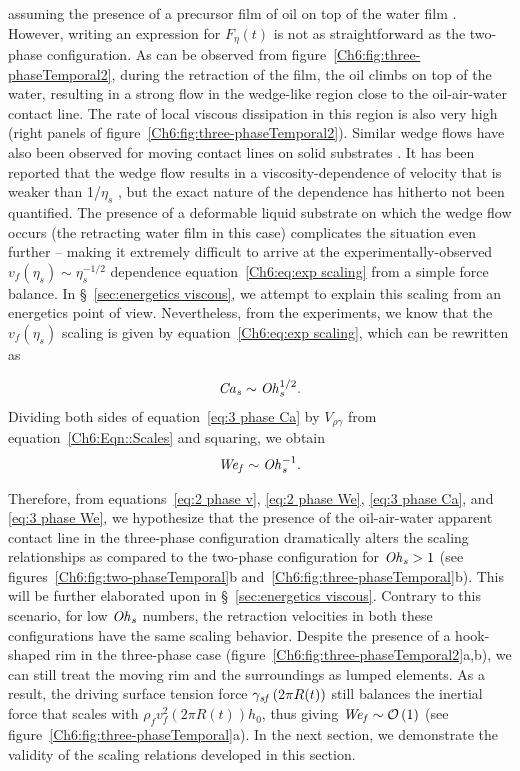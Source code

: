 \noindent assuming the presence of a precursor film of oil on top of the water film \citep[see \S~\ref{Ch6:sec:3-phaseTC Num methods} and][]{book-degennes, bonn2009wetting, thoraval-2013-pre}. However, writing an expression for $F_{\eta}(t)$ is not as straightforward as the two-phase configuration. As can be observed from figure~\ref{Ch6:fig:three-phaseTemporal2}, during the retraction of the film, the oil climbs on top of the water, resulting in a strong flow in the wedge-like region close to the oil-air-water contact line. The rate of local viscous dissipation in this region is also very high (right panels of figure~\ref{Ch6:fig:three-phaseTemporal2}). Similar wedge flows have also been observed for moving contact lines on solid substrates \citep{degennes-1985-rmp, marchand-2012-prl, snoeijer-2013-arfm}. It has been reported that the wedge flow results in a viscosity-dependence of velocity that is weaker than 1/$\eta_{s}$ \citep{marchand-2012-prl}, but the exact nature of the dependence has hitherto not been quantified. The presence of a deformable liquid substrate on which the wedge flow occurs (the retracting water film in this case) complicates the situation even further -- making it extremely difficult to arrive at the experimentally-observed $v_f(\eta_{s}) \sim \eta_{s}^{-1/2}$ dependence equation~\eqref{Ch6:eq:exp scaling} from a simple force balance. In \S~\ref{sec:energetics viscous}, we attempt to explain this scaling from an energetics point of view. Nevertheless, from the experiments, we know that the $v_f (\eta_{s})$ scaling is given by equation~\eqref{Ch6:eq:exp scaling}, which can be rewritten as

\begin{align}
	\mathit{Ca}_\mathit{s} \sim \mathit{Oh}_\mathit{s}^{1/2} .
	\label{eq:3 phase Ca}
\end{align}
Dividing both sides of equation~\eqref{eq:3 phase Ca} by $V_{\rho\gamma}$ from equation~\eqref{Ch6:Eqn::Scales} and squaring, we obtain
\begin{align}
	\mathit{We}_\mathit{f} \sim \mathit{Oh}_\mathit{s}^{-1} .
	\label{eq:3 phase We}
\end{align}

Therefore, from equations~\eqref{eq:2 phase v}, \eqref{eq:2 phase We}, \eqref{eq:3 phase Ca}, and \eqref{eq:3 phase We}, we hypothesize that the presence of the oil-air-water apparent contact line in the three-phase configuration dramatically alters the scaling relationships as compared to the two-phase configuration for $\mathit{Oh}_\mathit{s} > 1$ (see figures~\ref{Ch6:fig:two-phaseTemporal}b and~\ref{Ch6:fig:three-phaseTemporal}b). This will be further elaborated upon in \S~\ref{sec:energetics viscous}. Contrary to this scenario, for low $\mathit{Oh}_\mathit{s}$ numbers, the retraction velocities in both these configurations have the same scaling behavior. Despite the presence of a hook-shaped rim in the three-phase case (figure~\ref{Ch6:fig:three-phaseTemporal2}a,b), we can still treat the moving rim and the surroundings as lumped elements. As a result, the driving surface tension force $\gamma_\mathit{sf}\left(2\pi R(t)\right)$ still balances the inertial force that scales with $\rho_f v_f^2\left(2\pi R(t)\right)h_0$, thus giving $\mathit{We}_\mathit{f} \sim \mathcal{O}\left(1\right)$ (see figure~\ref{Ch6:fig:three-phaseTemporal}a). In the next section, we demonstrate the validity of the scaling relations developed in this section.


